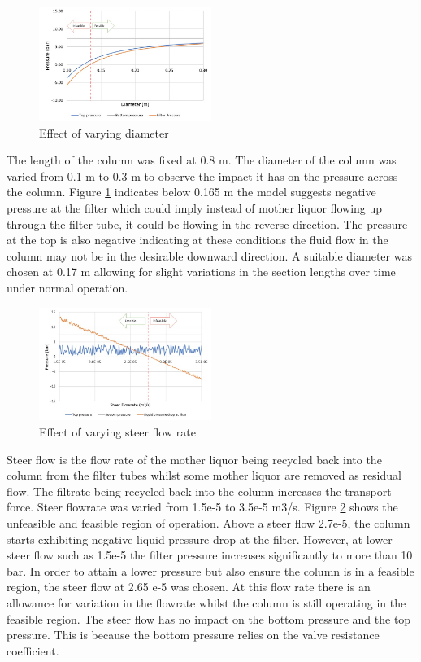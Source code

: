 \begin{figure}
\centering
\includegraphics[width=0.5\textwidth]{chapters/3-separation/figures/diameter.jpg}
\caption{ Effect of varying diameter}
\label{fig:dia_col}
\end{figure}

The length of the column was fixed at 0.8 m. The diameter of the column was varied from 0.1 m to 0.3 m to observe the impact it has on the pressure across the column. Figure \ref{fig:dia_col} indicates below 0.165 m the model suggests negative pressure at the filter which could imply instead of mother liquor flowing up through the filter tube, it could be flowing in the reverse direction. The pressure at the top is also negative indicating at these conditions the fluid flow in the column may not be in the desirable downward direction. A suitable diameter was chosen at 0.17 m allowing for slight variations in the section lengths over time under normal operation.

\begin{figure}
\centering
\includegraphics[width=0.5\textwidth]{chapters/3-separation/figures/steerflow.jpg}
\caption{ Effect of varying steer flow rate}
\label{fig:steer_col}
\end{figure}

Steer flow is the flow rate of the mother liquor being recycled back into the column from the filter tubes whilst some mother liquor are removed as residual flow. The filtrate being recycled back into the column increases the transport force. Steer flowrate was varied from 1.5e-5 to 3.5e-5 m3/s. Figure \ref{fig:steer_col} shows the unfeasible and feasible region of operation. Above a steer flow 2.7e-5, the column starts exhibiting negative liquid pressure drop at the filter. However, at lower steer flow such as 1.5e-5 the filter pressure increases significantly to more than 10 bar. In order to attain a lower pressure but also ensure the column is in a feasible region, the steer flow at 2.65 e-5 was chosen. At this flow rate there is an allowance for variation in the flowrate whilst the column is still operating in the feasible region. The steer flow has no impact on the bottom pressure and the top pressure. This is because the bottom pressure relies on the valve resistance coefficient. 

